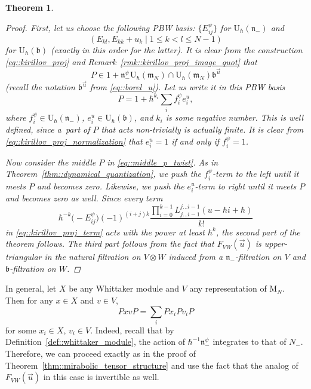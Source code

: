 \documentclass[10pt,a4paper]{article}
\numberwithin{equation}{section}
\newtheorem{Theorem}{Theorem}[section]
\newcommand{\U}{\mathrm{U}_{\hbar}}
\newcommand{\rM}{\mathrm{M}}
\renewcommand{\b}{\mathfrak{b}}
\newcommand{\n}{\mathfrak{n}}
\newcommand{\m}{\mathfrak{m}}
\begin{document}
\begin{Theorem}
\begin{proof}
			First, let us choose the following PBW basis: $\bigl\{E_{ij}^{\psi}\bigr\}$ for $\U(\n_-)$ and
			\[
			(E_{kl}, E_{kk} + u_k \mid 1 \leq k < l \leq N-1)
			\]
			for $\U(\b)$ (exactly in this order for the latter). It is clear from the construction \eqref{eq::kirillov_proj} and Remark~\ref{rmk::kirillov_proj_image_quot} that
			\begin{equation}
				\label{eq::kirillov_proj_normalization}
				P \in 1 + \n_-^{\psi} \U(\m_N) \cap \U(\m_N) \b^{\vec{u}}
			\end{equation}
			(recall the notation $\b^{\vec{u}}$ from \eqref{eq::borel_u}). Let us write it in this PBW basis
			\begin{equation*}
				P = 1 + \hbar^{k_i}\sum\limits_i f^{\psi}_i e_i^u,
			\end{equation*}
			where $f^{\psi}_i \in \U(\n_-)$, $e_i^u \in \U(\b)$, and $k_i$ is some negative number. This is well defined, since a~part of $P$ that acts non-trivially is actually finite. It is clear from \eqref{eq::kirillov_proj_normalization} that $e^u_i=1$ if and only if $f^{\psi}_i=1$.
			
			Now consider the middle $P$ in \eqref{eq::middle_p_twist}. As in Theorem~\ref{thm::dynamical_quantization}, we push the $f_i^{\psi}$-term to the left until it meets $P$ and becomes zero. Likewise, we push the $e_i^u$-term to right until it meets $P$ and becomes zero as well. Since every term
			\[
			\hbar^{-k} \bigl(-E_{ij}^{\psi}\bigr) (-1)^{(i+j)k} \frac{\prod_{i=0}^{k-1} L_{j \dots i-1}^{j \dots i-1}(u-\hbar i + \hbar)}{k!}
			\]
			in \eqref{eq::kirillov_proj_term} acts with the power at least $\hbar^k$, the second part of the theorem follows. The third part follows from the fact that $F_{VW}(\vec{u})$ is upper-triangular in the natural filtration on $V\otimes W$ induced from a $\n_-$-filtration on $V$ and $\b$-filtration on $W$.
		\end{proof}
	\end{Theorem}
	
	\begin{Remark}
		\label{rmk::mirabolic_tensor_structure}
		In general, let $X$ be any Whittaker module and $V$ any representation of $\rM_N$. Then for any $x\in X$ and $v\in V$,
		\[
		PxvP = \sum\limits_i Px_i P v_i P
		\]
		for some $x_i\in X$, $v_i \in V$. Indeed, recall that by Definition~\ref{def::whittaker_module}, the action of $\hbar^{-1} \n_-^{\psi}$ integrates to that of $N_-$. Therefore, we can proceed exactly as in the proof of Theorem~\ref{thm::mirabolic_tensor_structure} and use the fact that the analog of $F_{VW}(\vec{u})$ in this case is invertible as well.
	\end{Remark}
	
\end{document}
